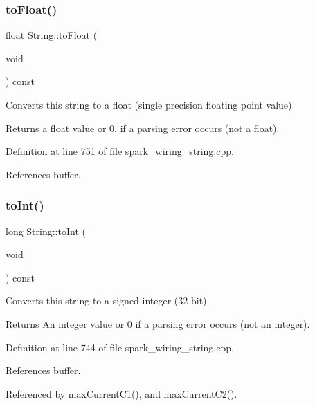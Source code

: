 \subsubsection{\texorpdfstring{to\+Float()}{toFloat()}}
{\footnotesize\ttfamily float String\+::to\+Float (\begin{DoxyParamCaption}\item[{void}]{ }\end{DoxyParamCaption}) const}



Converts this string to a float (single precision floating point value) 

\begin{DoxyReturn}{Returns}
a float value or 0. if a parsing error occurs (not a float). 
\end{DoxyReturn}


Definition at line 751 of file spark\+\_\+wiring\+\_\+string.\+cpp.



References buffer.

\mbox{\label{class_string_a2dc5a9a787f8ff266d1130594ec65237}} 
\subsubsection{\texorpdfstring{to\+Int()}{toInt()}}
{\footnotesize\ttfamily long String\+::to\+Int (\begin{DoxyParamCaption}\item[{void}]{ }\end{DoxyParamCaption}) const}



Converts this string to a signed integer (32-\/bit) 

\begin{DoxyReturn}{Returns}
An integer value or 0 if a parsing error occurs (not an integer). 
\end{DoxyReturn}


Definition at line 744 of file spark\+\_\+wiring\+\_\+string.\+cpp.



References buffer.



Referenced by max\+Current\+C1(), and max\+Current\+C2().

\mbox{\label{class_string_a9754260e421ad64409d2fe5817dc243f}} 
